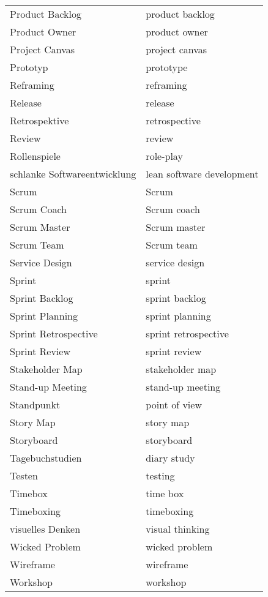 \documentclass[a4paper]{article}
\begin{document}
\begin{longtable}{ p{5cm} p{5cm}}
Product Backlog	&	product backlog\\
Product Owner	&	product owner\\
Project Canvas	&	project canvas\\
Prototyp	&	prototype\\
Reframing	&	reframing\\
Release	&	release\\
Retrospektive	&	retrospective\\
Review	&	review\\
Rollenspiele	&	role-play\\
schlanke Softwareentwicklung	&	lean software development\\
Scrum	&	Scrum\\
Scrum Coach	&	Scrum coach\\
Scrum Master	&	Scrum master\\
Scrum Team	&	Scrum team\\
Service Design	&	service design\\
Sprint	&	sprint\\
Sprint Backlog	&	sprint backlog\\
Sprint Planning	&	sprint planning\\
Sprint Retrospective	&	sprint retrospective\\
Sprint Review	&	sprint review\\
Stakeholder Map	&	stakeholder map\\
Stand-up Meeting	&	stand-up meeting\\
Standpunkt	&	point of view\\
Story Map	&	story map\\
Storyboard	&	storyboard\\
Tagebuchstudien	&	diary study\\
Testen	&	testing\\
Timebox	&	time box\\
Timeboxing	&	timeboxing\\
visuelles Denken	&	visual thinking\\
Wicked Problem	&	wicked problem\\
Wireframe	&	wireframe\\
Workshop	&	workshop\\
		\hline
\end{longtable}
\end{document}
